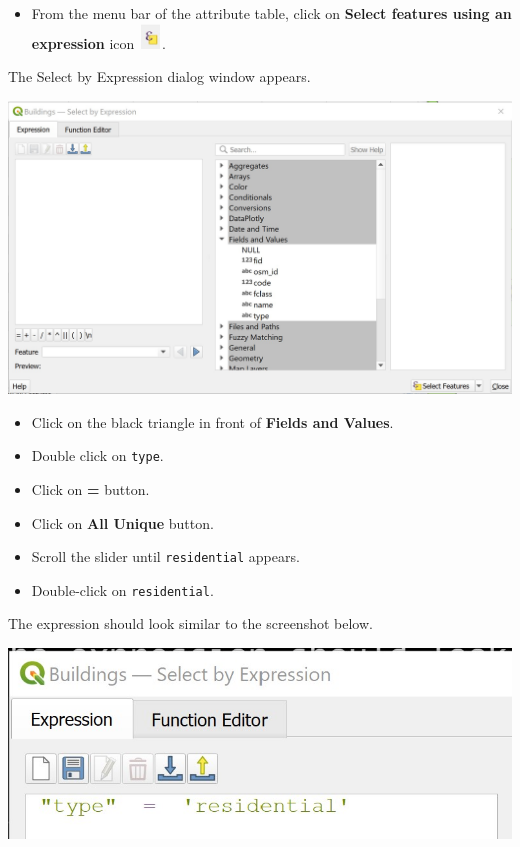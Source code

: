 \documentclass[
  letterpaper,
  DIV=11,
  numbers=noendperiod]{scrreprt}
\providecommand{\tightlist}{%
  \setlength{\itemsep}{0pt}\setlength{\parskip}{0pt}}\usepackage{longtable,booktabs,array}
\begin{document}
\begin{itemize}
\tightlist
\item
  From the menu bar of the attribute table, click on \textbf{Select
  features using an expression} icon
  \includegraphics[width=0.23958in,height=0.26042in]{./img04/image101.jpg}.
\end{itemize}

The Select by Expression dialog window appears.

\includegraphics{./img04/image102.jpg}

\begin{itemize}
\item
  Click on the black triangle in front of \textbf{Fields and Values}.
\item
  Double click on \texttt{type}.
\item
  Click on \textbf{=} button.
\item
  Click on \textbf{All Unique} button.
\item
  Scroll the slider until \texttt{residential} appears.
\item
  Double-click on \texttt{residential}.
\end{itemize}

The expression should look similar to the screenshot below.

\includegraphics{./img04/image103.jpg}
\end{document}

